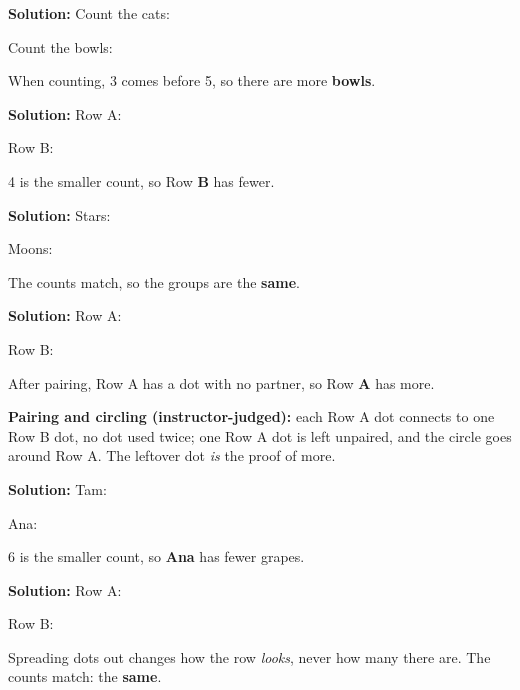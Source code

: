 \documentclass[12pt]{article}
\begin{document}



\textbf{Solution:} Count the cats: 

Count the bowls: 

When counting, 3 comes before 5, so there are more \textbf{bowls}. 


\textbf{Solution:} Row A: 

Row B: 

4 is the smaller count, so Row \textbf{B} has fewer. 


\textbf{Solution:} Stars: 

Moons: 

The counts match, so the groups are the \textbf{same}. 


\textbf{Solution:} Row A: 

Row B: 

After pairing, Row A has a dot with no partner, so Row \textbf{A} has more.

\textbf{Pairing and circling (instructor-judged):} each Row A dot connects to
one Row B dot, no dot used twice; one Row A dot is left unpaired, and the
circle goes around Row A. The leftover dot \emph{is} the proof of more.


\textbf{Solution:} Tam: 

Ana: 

6 is the smaller count, so \textbf{Ana} has fewer grapes. 


\textbf{Solution:} Row A: 

Row B: 

Spreading dots out changes how the row \emph{looks}, never how many there are.
The counts match: the \textbf{same}. 
\end{document}
